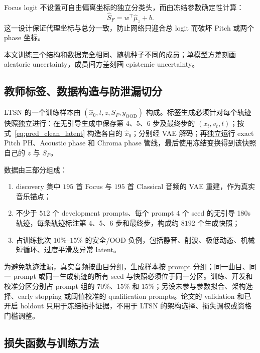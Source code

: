 \documentclass{article}
\begin{document}
Focus logit 不设置可自由偏离坐标的独立分类头，而由冻结参数确定性计算：
\begin{equation}
\hat{S}_F=w^{\top}\hat{\mu}_z+b.
\label{eq:ltsn_frozen_readout}
\end{equation}
这一设计保证代理坐标与总分一致，防止网络只迎合总 logit 而破坏 Pitch 或两个 phase 坐标。

本文训练三个结构和数据完全相同、随机种子不同的成员；单模型方差刻画 aleatoric uncertainty，成员间方差刻画 epistemic uncertainty。

\subsection{教师标签、数据构造与防泄漏切分}

LTSN 的一个训练样本由 $(\hat{x}_0,t,z,S_F,y_{\mathrm{OOD}})$ 构成。标签生成必须针对每个轨迹快照独立进行：在无引导生成中保存第 4、5、6 步及最终步的 $(x_t,v_t,t)$；按式~\eqref{eq:pred_clean_latent} 构造各自的 $\hat{x}_0$；分别经 VAE 解码；再独立运行 exact Pitch PH、Acoustic phase 和 Chroma phase 管线，最后使用冻结变换得到该快照自己的 $z$ 与 $S_F$。

数据由三部分组成：
\begin{enumerate}
    \item discovery 集中 $195$ 首 Focus 与 $195$ 首 Classical 音频的 VAE 重建，作为真实音乐锚点；
    \item 不少于 $512$ 个 development prompts、每个 prompt $4$ 个 seed 的无引导 180s 轨迹，每条轨迹标注第 4、5、6 步和最终步，构成约 $8192$ 个生成快照；
    \item 占训练批次 $10\%$--$15\%$ 的安全/OOD 负例，包括静音、削波、极低动态、机械短循环、过度平滑及异常 latent。
\end{enumerate}

为避免轨迹泄漏，真实音频按曲目分组，生成样本按 prompt 分组；同一曲目、同一 prompt 或同一生成轨迹的所有 seed 与快照必须位于同一分区。训练、开发和校准分区分别占 prompt 组的 $70\%$、$15\%$ 和 $15\%$；另设未参与参数拟合、架构选择、early stopping 或阈值校准的 qualification prompts。论文的 validation 和已开启 holdout 只用于冻结拓扑证据，不用于 LTSN 的架构选择、损失调权或资格门槛调整。

\subsection{损失函数与训练方法}
\end{document}
